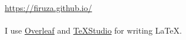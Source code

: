 \documentclass{article}
\begin{document}
    \url{https://firuza.github.io/}

    \paragraph{}
    I use \href{https://www.overleaf.com}{Overleaf} and \href{https://texstudio.org}{TeXStudio} for writing \LaTeX.
\end{document}
